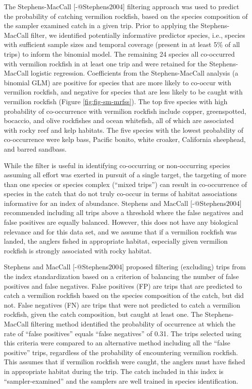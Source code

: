 \documentclass[
]{article}
\begin{document}
The Stephens-MacCall {[}-@Stephens2004{]} filtering approach was used to predict the
probability of catching vermilion rockfish, based
on the species composition of the sampler examined catch in a given trip. Prior
to applying the Stephens-MacCall filter, we identified potentially informative
predictor species, i.e., species with sufficient sample sizes and temporal coverage
(present in at least 5\% of all trips) to inform the binomial model. The remaining
24 species all co-occurred with vermilion rockfish in at least one trip
and were retained for the Stephens-MacCall logistic regression. Coefficients
from the Stephens-MacCall analysis (a binomial GLM) are positive
for species that are more likely to co-occur with vermilion rockfish,
and negative for species that are less likely to be caught with vermilion rockfish
(Figure \ref{fig:fig-sm-mrfss}).
The top five species with high probability of co-occurrence with vermilion rockfish include
copper, greenspotted, bocaccio, and olive rockfishes and ocean whitefish, all of which are associated with rocky reef and kelp
habitats. The five species with the lowest probability of co-occurrence were
kelp bass, Pacific bonito, white croaker, California sheephead, and barred sandbass.

While the filter is useful in identifying co-occurring or non-occurring species
assuming all effort was exerted in pursuit of a single target, the targeting of
more than one species or species complex (``mixed trips'') can result in co-occurrence of species in the catch that do not truly co-occur in terms of habitat
associations informative for an index of abundance. Stephens and MacCall
{[}-@Stephens2004{]} recommended including all trips above a threshold where the
false negatives and false positives are equally balanced. However, this does
not have any biological relevance and for this data set, and we assume that if a
vermilion rockfish was landed, the anglers fished in appropriate habitat,
especially given vermilion rockfish is strongly associated with rocky habitat.

Stephens and MacCall {[}-@Stephens2004{]} proposed filtering (excluding) trips from the index
standardization based on a criterion of balancing the number of false positives
and false negatives. False positives (FP) are trips that are predicted to catch
a vermilion rockfish based on the species composition of the catch, but did not. False
negatives (FN) are trips that were not predicted to catch a vermilion rockfish, given the
catch composition, but caught at least one. The Stephens-MacCall filtering method identified the probability of occurrence at which the rate of ``false
positives'' equals ``false negatives'' of 0.31. The
trips selected using this criteria were compared to an alternative method
including all the ``false positive'' trips, regardless of the probability of
encountering vermilion rockfish.
This assumes that if vermilion rockfish were caught, the anglers must have fished in
appropriate habitat during the trip. The catch included in this index is
``sampler-examined'' and the samplers are well trained in species identification.
\end{document}
